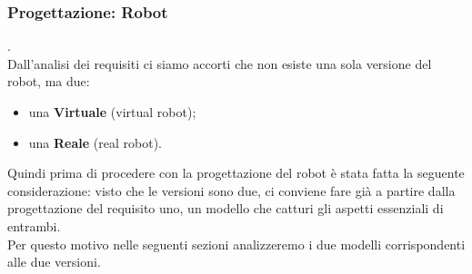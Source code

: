 \documentclass{llncs}
\begin{document}
\subsubsection{Progettazione: Robot}.
\label{ProgettazioneReq1Robot}
\vspace*{1ex}
\\
Dall'analisi dei requisiti ci siamo accorti che non esiste una sola versione del robot, ma due:
\begin{itemize}
    \item una \textbf{Virtuale} (virtual robot);
    \item una \textbf{Reale} (real robot).
\end{itemize}
Quindi prima di procedere con la progettazione del robot \`e stata fatta la seguente considerazione: visto che le versioni sono due, ci conviene fare gi\`a a partire dalla progettazione del requisito uno, un modello che catturi gli aspetti essenziali di entrambi.\\
Per questo motivo nelle seguenti sezioni analizzeremo i due modelli corrispondenti alle due versioni.

\end{document}
